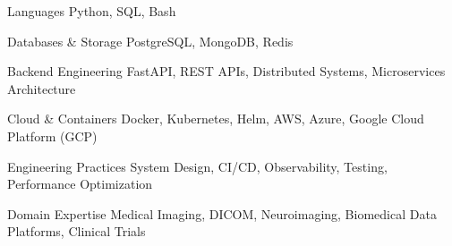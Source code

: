 

\begin{cvskills}

  \cvskill
    {Languages} %
    {Python, SQL, Bash} %

  \cvskill
    {Databases \& Storage} %
    {PostgreSQL, MongoDB, Redis} %

  \cvskill
    {Backend Engineering} %
    {FastAPI, REST APIs, Distributed Systems, Microservices Architecture} %
    
  \cvskill
    {Cloud \& Containers} %
    {Docker, Kubernetes, Helm, AWS, Azure, Google Cloud Platform (GCP)} %

  \cvskill
    {Engineering Practices} %
    {System Design, CI/CD, Observability, Testing, Performance Optimization} %


  \cvskill
    {Domain Expertise} %
    {Medical Imaging, DICOM, Neuroimaging, Biomedical Data Platforms, Clinical Trials} %

\end{cvskills}
